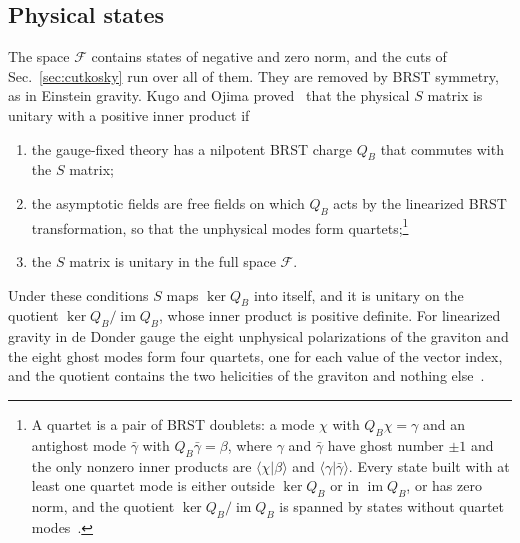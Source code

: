 \documentclass[a4paper,11pt]{article}
\begin{document}
\subsection{Physical states}
\label{sec:quartets}

The space $\mathcal F$ contains states of negative and zero norm, and the cuts of Sec.~\ref{sec:cutkosky} run over all of them. They are removed by BRST symmetry, as in Einstein gravity. Kugo and Ojima proved~\cite{KugoOjima1978,KugoOjima1979} that the physical $S$ matrix is unitary with a positive inner product if
\begin{enumerate}[label=\textup{(Q\arabic*)},leftmargin=2.4em,itemsep=0.15em]
\item the gauge-fixed theory has a nilpotent BRST charge $Q_B$ that commutes with the $S$ matrix;
\item the asymptotic fields are free fields on which $Q_B$ acts by the linearized BRST transformation, so that the unphysical modes form quartets;\footnote{A quartet is a pair of BRST doublets: a mode $\chi$ with $Q_B\chi=\gamma$ and an antighost mode $\bar\gamma$ with $Q_B\bar\gamma=\beta$, where $\gamma$ and $\bar\gamma$ have ghost number $\pm1$ and the only nonzero inner products are $\langle\chi|\beta\rangle$ and $\langle\gamma|\bar\gamma\rangle$. Every state built with at least one quartet mode is either outside $\ker Q_B$ or in $\operatorname{im}Q_B$, or has zero norm, and the quotient $\ker Q_B/\operatorname{im}Q_B$ is spanned by states without quartet modes~\cite{KugoOjima1979}.}
\item the $S$ matrix is unitary in the full space $\mathcal F$.
\end{enumerate}
Under these conditions $S$ maps $\ker Q_B$ into itself, and it is unitary on the quotient $\ker Q_B/\operatorname{im}Q_B$, whose inner product is positive definite. For linearized gravity in de Donder gauge the eight unphysical polarizations of the graviton and the eight ghost modes form four quartets, one for each value of the vector index, and the quotient contains the two helicities of the graviton and nothing else~\cite{KugoOjima1978}.
\end{document}
